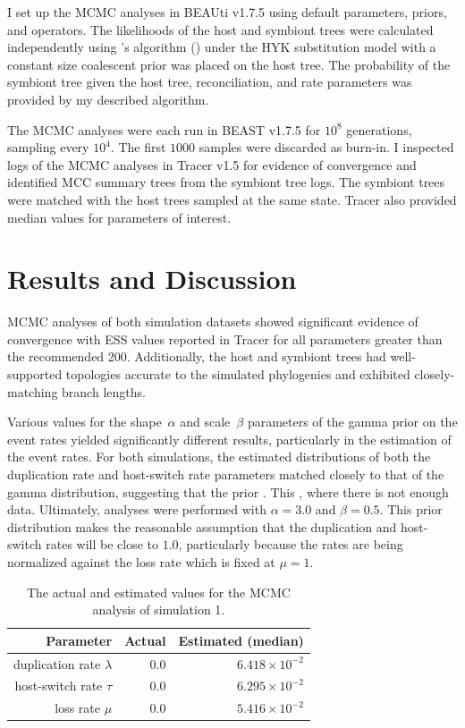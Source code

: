 \documentclass[12pt,letterpaper]{article}
\newcommand{\aposcite}[2]{\citeauthor{#1}'s #2 (\citeyear{#1})}
\begin{document}
I set up the \ac{MCMC} analyses in BEAUti v1.7.5 using default parameters, priors, and operators. The likelihoods of the host and symbiont trees were calculated independently using \aposcite{Felsenstein:1981}{algorithm} under the HYK substitution model \parencite{Hasegawa:1985} with a constant size coalescent \parencite{Kingman:1982} prior was placed on the host tree. The probability of the symbiont tree given the host tree, reconciliation, and rate parameters was provided by my described algorithm.

The \ac{MCMC} analyses were each run in BEAST v1.7.5 for $10^8$ generations, sampling every $10^4$. The first $1000$ samples were discarded as burn-in. I inspected logs of the \ac{MCMC} analyses in Tracer v1.5 \parencite{Rambaut:2009} for evidence of convergence and identified \ac{MCC} summary trees from the symbiont tree logs. The symbiont trees were matched with the host trees sampled at the same state. Tracer \parencite{Rambaut:2009} also provided median values for parameters of interest.

\section*{Results and Discussion}

\ac{MCMC} analyses of both simulation datasets showed significant evidence of convergence with \ac{ESS} values reported in Tracer \parencite{Rambaut:2009} for all parameters greater than the recommended 200. Additionally, the host and symbiont trees had well-supported topologies accurate to the simulated phylogenies and exhibited closely-matching branch lengths.

Various values for the shape~$\alpha$ and scale~$\beta$ parameters of the gamma prior on the event rates yielded significantly different results, particularly in the estimation of the event rates. For both simulations, the estimated distributions of both the duplication rate and host-switch rate parameters matched closely to that of the gamma distribution, suggesting that the prior . This , where there is not enough data. Ultimately, analyses were performed with $\alpha = 3.0$ and $\beta = 0.5$. This prior distribution makes the reasonable assumption that the duplication and host-switch rates will be close to $1.0$, particularly because the rates are being normalized against the loss rate which is fixed at $\mu = 1$. 

\begin{table}
\centering
\caption{The actual and estimated values for the \ac{MCMC} analysis of simulation 1.}
\begin{tabular}{r r r}
\toprule
\textbf{Parameter} & \textbf{Actual} & \textbf{Estimated (median)} \\
\midrule
duplication rate $\lambda$ & 0.0 & $6.418 \times 10^{-2}$ \\
host-switch rate $\tau$ & 0.0 & $6.295 \times 10^{-2}$ \\
loss rate $\mu$ & 0.0 & $5.416 \times 10^{-2}$ \\
\bottomrule
\end{tabular}
\label{tab:sim1}
\end{table}
\end{document}
